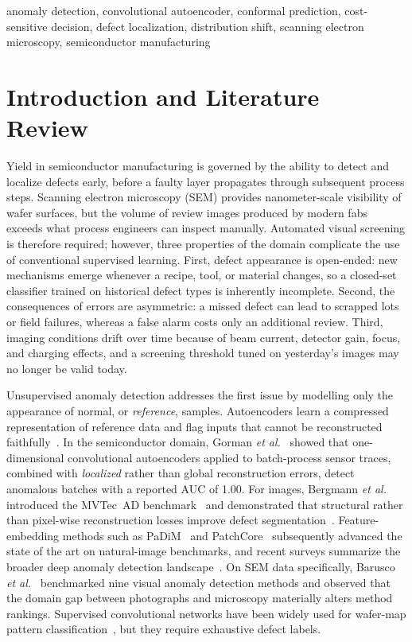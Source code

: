 \documentclass[conference]{IEEEtran}
\begin{document}
\begin{IEEEkeywords}
anomaly detection, convolutional autoencoder, conformal prediction, cost-sensitive decision, defect localization, distribution shift, scanning electron microscopy, semiconductor manufacturing
\end{IEEEkeywords}

\section{Introduction and Literature Review}
Yield in semiconductor manufacturing is governed by the ability to detect and localize defects early, before a faulty layer propagates through subsequent process steps. Scanning electron microscopy (SEM) provides nanometer-scale visibility of wafer surfaces, but the volume of review images produced by modern fabs exceeds what process engineers can inspect manually. Automated visual screening is therefore required; however, three properties of the domain complicate the use of conventional supervised learning. First, defect appearance is open-ended: new mechanisms emerge whenever a recipe, tool, or material changes, so a closed-set classifier trained on historical defect types is inherently incomplete. Second, the consequences of errors are asymmetric: a missed defect can lead to scrapped lots or field failures, whereas a false alarm costs only an additional review. Third, imaging conditions drift over time because of beam current, detector gain, focus, and charging effects, and a screening threshold tuned on yesterday's images may no longer be valid today.

Unsupervised anomaly detection addresses the first issue by modelling only the appearance of normal, or \emph{reference}, samples. Autoencoders learn a compressed representation of reference data and flag inputs that cannot be reconstructed faithfully~\cite{hinton2006,masci2011}. In the semiconductor domain, Gorman \emph{et al.}~\cite{gorman2023} showed that one-dimensional convolutional autoencoders applied to batch-process sensor traces, combined with \emph{localized} rather than global reconstruction errors, detect anomalous batches with a reported AUC of 1.00. For images, Bergmann \emph{et al.} introduced the MVTec~AD benchmark~\cite{bergmann2019mvtec} and demonstrated that structural rather than pixel-wise reconstruction losses improve defect segmentation~\cite{bergmann2019ssim}. Feature-embedding methods such as PaDiM~\cite{defard2021} and PatchCore~\cite{roth2022} subsequently advanced the state of the art on natural-image benchmarks, and recent surveys summarize the broader deep anomaly detection landscape~\cite{pang2021}. On SEM data specifically, Barusco \emph{et al.}~\cite{barusco2025} benchmarked nine visual anomaly detection methods and observed that the domain gap between photographs and microscopy materially alters method rankings. Supervised convolutional networks have been widely used for wafer-map pattern classification~\cite{nakazawa2018}, but they require exhaustive defect labels.
\end{document}
